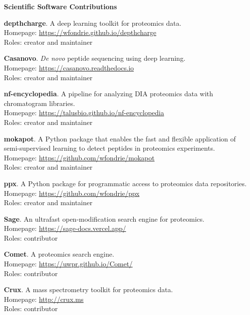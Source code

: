 \documentclass[11pt]{article}
\newcommand{\mysection}[1]{\vspace{1ex} \textbf{\large \textsf{#1} \quad \hrulefill}}
\newcommand{\myref}[1]{\href{#1}{\url{#1}}}
\begin{document}
\mysection{Scientific Software Contributions}
\begin{etaremune}
  \item \textbf{depthcharge}. A deep learning toolkit for proteomics data. \\
  Homepage: \myref{https://wfondrie.github.io/depthcharge} \\
  Roles: creator and maintainer

  \item \textbf{Casanovo}. \textit{ De novo } peptide sequencing using deep learning. \\
  Homepage: \myref{https://casanovo.readthedocs.io} \\
  Roles: creator and maintainer

  \item \textbf{nf-encyclopedia}. A pipeline for analyzing DIA proteomics data with chromatogram libraries. \\
  Homepage: \myref{https://talusbio.github.io/nf-encyclopedia} \\
  Roles: creator and maintainer

  \item \textbf{mokapot}. A Python package that enables the fast and flexible
  application of semi-supervised learning to detect peptides in proteomics
  experiments. \\
  Homepage: \myref{https://github.com/wfondrie/mokapot} \\
  Roles: creator and maintainer

  \item \textbf{ppx}. A Python package for programmatic access to proteomics
  data repositories. \\
  Homepage: \myref{https://github.com/wfondrie/ppx} \\
  Roles: creator and maintainer

  \item \textbf{Sage}. An ultrafast open-modification search engine for proteomics. \\
  Homepage: \myref{https://sage-docs.vercel.app/} \\
  Roles: contributor

  \item \textbf{Comet}. A proteomics search engine. \\
  Homepage: \myref{https://uwpr.github.io/Comet/} \\
  Roles: contributor

  \item \textbf{Crux}. A mass spectrometry toolkit for proteomics data. \\
  Homepage: \myref{http://crux.ms} \\
  Roles: contributor


\end{etaremune}
\end{document}
